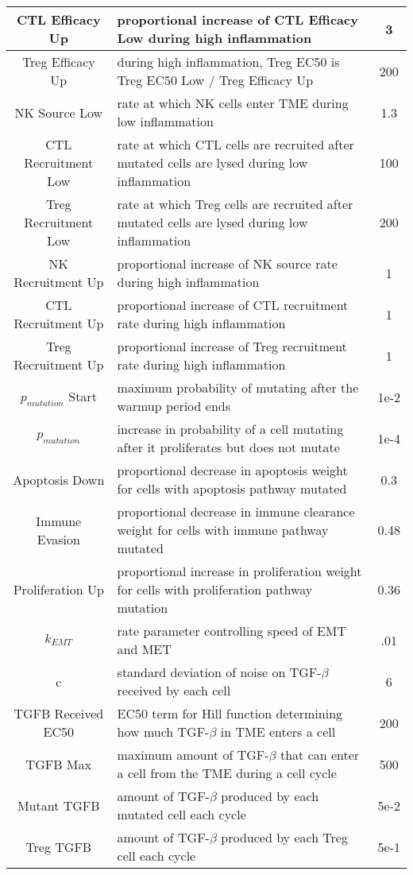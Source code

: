 \documentclass[11pt, a4paper, preprint]{article}
\begin{document}
\begin{center}
\begin{longtable}{||c | p{10cm} | c||}
  \hline
  CTL Efficacy Up & proportional increase of CTL Efficacy Low during high inflammation & 3 \\
  \hline
  Treg Efficacy Up & during high inflammation, Treg EC50 is Treg EC50 Low / Treg Efficacy Up & 200 \\
  \hline
  NK Source Low & rate at which NK cells enter TME during low inflammation & 1.3 \\ 
  \hline
  CTL Recruitment Low & rate at which CTL cells are recruited after mutated cells are lysed during low inflammation & 100 \\ 
  \hline
  Treg Recruitment Low & rate at which Treg cells are recruited after mutated cells are lysed during low inflammation & 200 \\
  \hline
  NK Recruitment Up & proportional increase of NK source rate during high inflammation & 1 \\
  \hline
  CTL Recruitment Up & proportional increase of CTL recruitment rate during high inflammation & 1 \\
  \hline
   Treg Recruitment Up & proportional increase of Treg recruitment rate during high inflammation & 1 \\
  \hline
  $p_{mutation}$ Start & maximum probability of mutating after the warmup period ends & 1e-2 \\
  \hline
  $p_{mutation}$ & increase in probability of a cell mutating after it proliferates but does not mutate & 1e-4 \\
  \hline
  Apoptosis Down & proportional decrease in apoptosis weight for cells with apoptosis pathway mutated & 0.3 \\
  \hline
  Immune Evasion & proportional decrease in immune clearance weight for cells with immune pathway mutated & 0.48 \\
  \hline
  Proliferation Up & proportional increase in proliferation weight for cells with proliferation pathway mutation & 0.36 \\
  \hline
  $k_{EMT}$ & rate parameter controlling speed of EMT and MET & .01 \\
  \hline
  c & standard deviation of noise on TGF-$\beta$ received by each cell & 6 \\
  \hline
  TGFB Received EC50 & EC50 term for Hill function determining how much TGF-$\beta$ in TME enters a cell & 200 \\
  \hline
  TGFB Max & maximum amount of TGF-$\beta$ that can enter a cell from the TME during a cell cycle & 500 \\
  \hline 
  Mutant TGFB & amount of TGF-$\beta$ produced by each mutated cell each cycle & 5e-2 \\
  \hline
  Treg TGFB & amount of TGF-$\beta$ produced by each Treg cell each cycle & 5e-1 \\
  \hline
\end{longtable}
\end{center}
\end{document}
